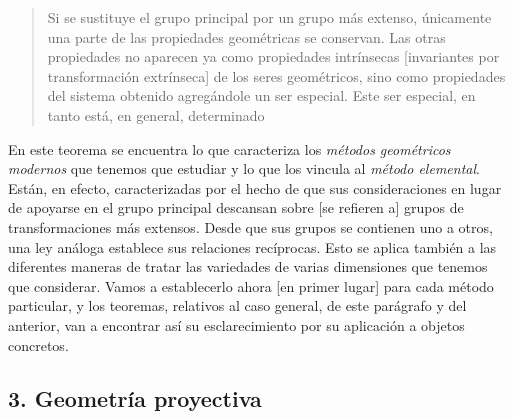 \documentclass[a4paper, 12pt]{article}
\begin{document}
\begin{quote}\it 

Si se sustituye el grupo principal por un grupo más extenso, únicamente una parte de las propiedades geométricas se conservan. Las otras propiedades no aparecen ya como propiedades intrínsecas [invariantes por transformación extrínseca] de los seres geométricos, sino como propiedades del sistema obtenido agregándole un ser especial. Este ser especial, en tanto está, en general, determinado

\end{quote} 

En este teorema se encuentra lo que caracteriza los \textit{métodos geométricos modernos} que tenemos que estudiar y lo que los vincula al \textit{método elemental}. Están, en efecto, caracterizadas por el hecho de que sus consideraciones en lugar de apoyarse en el grupo principal descansan sobre [se refieren a] grupos de transformaciones más extensos. Desde que sus grupos se contienen uno a otros, una ley análoga establece sus relaciones recíprocas. Esto se aplica también a las diferentes maneras de tratar las variedades de varias dimensiones que tenemos que considerar. Vamos a establecerlo ahora [en primer lugar] para cada método particular, y los teoremas, relativos al caso general, de este parágrafo y del anterior, van a encontrar así su esclarecimiento por su aplicación a objetos concretos. 



\subsection*{3. Geometría proyectiva} 
\end{document}
